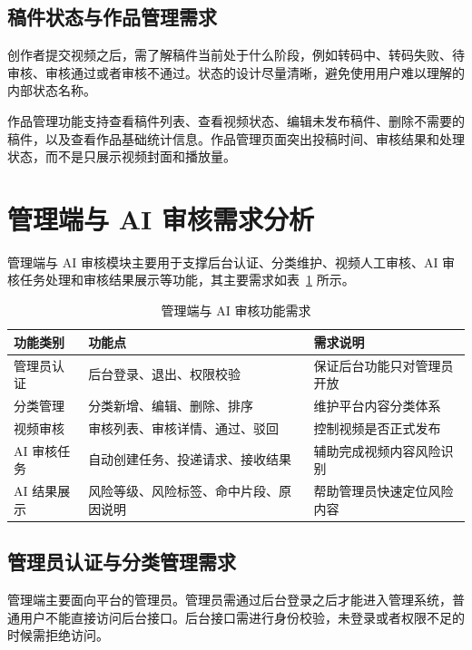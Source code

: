 \subsection{稿件状态与作品管理需求}
\label{subsec:post-status-work-management}

创作者提交视频之后，需了解稿件当前处于什么阶段，例如转码中、转码失败、待审核、审核通过或者审核不通过。状态的设计尽量清晰，避免使用用户难以理解的内部状态名称。

作品管理功能支持查看稿件列表、查看视频状态、编辑未发布稿件、删除不需要的稿件，以及查看作品基础统计信息。作品管理页面突出投稿时间、审核结果和处理状态，而不是只展示视频封面和播放量。

\section{管理端与 AI 审核需求分析}
\label{sec:admin-ai-requirements}

管理端与 AI 审核模块主要用于支撑后台认证、分类维护、视频人工审核、AI 审核任务处理和审核结果展示等功能，其主要需求如表~\ref{tab:admin-ai-functions} 所示。

\begin{table}[htbp]
  \centering
  \caption{管理端与 AI 审核功能需求}
  \label{tab:admin-ai-functions}
  \begin{tabular}{p{}p{}p{}}
    \hline
    \textbf{功能类别} & \textbf{功能点} & \textbf{需求说明} \\
    \hline
    管理员认证 & 后台登录、退出、权限校验 & 保证后台功能只对管理员开放 \\
    分类管理 & 分类新增、编辑、删除、排序 & 维护平台内容分类体系 \\
    视频审核 & 审核列表、审核详情、通过、驳回 & 控制视频是否正式发布 \\
    AI 审核任务 & 自动创建任务、投递请求、接收结果 & 辅助完成视频内容风险识别 \\
    AI 结果展示 & 风险等级、风险标签、命中片段、原因说明 & 帮助管理员快速定位风险内容 \\
    \hline
  \end{tabular}
\end{table}

\subsection{管理员认证与分类管理需求}
\label{subsec:admin-category-requirements}

管理端主要面向平台的管理员。管理员需通过后台登录之后才能进入管理系统，普通用户不能直接访问后台接口。后台接口需进行身份校验，未登录或者权限不足的时候需拒绝访问。

